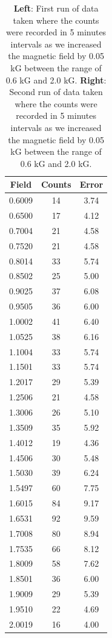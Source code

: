 \begin{table}[h!]
\begin{minipage}[b]{0.45\linewidth}
\end{minipage}
\begin{minipage}[b]{0.45\linewidth}\centering
\begin{tabular}{|c|c|c|} \hline
Field	&	Counts	&	Error	\\ \hline
0.6009	&	14	&	3.74	\\ \hline
0.6500	&	17	&	4.12	\\ \hline
0.7004	&	21	&	4.58	\\ \hline
0.7520	&	21	&	4.58	\\ \hline
0.8014	&	33	&	5.74	\\ \hline
0.8502	&	25	&	5.00	\\ \hline
0.9025	&	37	&	6.08	\\ \hline
0.9505	&	36	&	6.00	\\ \hline
1.0002	&	41	&	6.40	\\ \hline
1.0525	&	38	&	6.16	\\ \hline
1.1004	&	33	&	5.74	\\ \hline
1.1501	&	33	&	5.74	\\ \hline
1.2017	&	29	&	5.39	\\ \hline
1.2506	&	21	&	4.58	\\ \hline
1.3006	&	26	&	5.10	\\ \hline
1.3509	&	35	&	5.92	\\ \hline
1.4012	&	19	&	4.36	\\ \hline
1.4506	&	30	&	5.48	\\ \hline
1.5030	&	39	&	6.24	\\ \hline
1.5497	&	60	&	7.75	\\ \hline
1.6015	&	84	&	9.17	\\ \hline
1.6531	&	92	&	9.59	\\ \hline
1.7008	&	80	&	8.94	\\ \hline
1.7535	&	66	&	8.12	\\ \hline
1.8009	&	58	&	7.62	\\ \hline
1.8501	&	36	&	6.00	\\ \hline
1.9009	&	29	&	5.39	\\ \hline
1.9510	&	22	&	4.69	\\ \hline
2.0019	&	16	&	4.00	\\ \hline
\end{tabular}
\end{minipage}
\caption{\textbf{Left}: First run of data taken where the counts were recorded in 5 minutes intervals as we increased the magnetic field by 0.05 kG between the range of 0.6 kG and 2.0 kG. \textbf{Right}: Second run of data taken where the counts were recorded in 5 minutes intervals as we increased the magnetic field by 0.05 kG between the range of 0.6 kG and 2.0 kG.}
\end{table}

